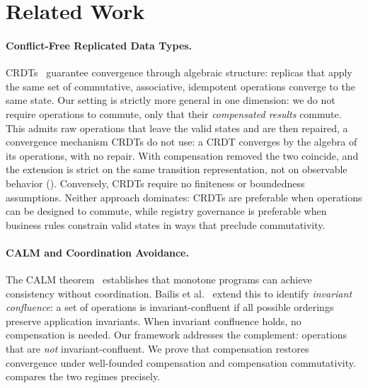\documentclass[11pt,a4paper]{article}
\theoremstyle{plain}
\theoremstyle{definition}
\theoremstyle{remark}
\renewcommand{\_}{\textunderscore\allowbreak}
\begin{document}
\section{Related Work}
\label{sec:related}

\paragraph{Conflict-Free Replicated Data Types.}
CRDTs~\cite{shapiro2011crdt} guarantee convergence through algebraic
structure: replicas that apply the same set of commutative, associative,
idempotent operations converge to the same state.  Our setting is strictly more
general in one dimension: we do not require operations to commute, only that
their \emph{compensated results} commute.  This admits raw operations that
leave the valid states and are then repaired, a convergence mechanism CRDTs do
not use: a CRDT converges by the algebra of its operations, with no repair.
With compensation removed the two coincide, and the extension is strict on the
same transition representation, not on observable behavior
().  Conversely,
CRDTs require no finiteness or boundedness assumptions.  Neither approach
dominates: CRDTs are preferable when operations can be designed to commute,
while registry governance is preferable when business rules constrain valid
states in ways that preclude commutativity.

\paragraph{CALM and Coordination Avoidance.}
The CALM theorem~\cite{hellerstein2010declarative,ameloot2013relational}
establishes that monotone programs can achieve consistency without coordination.
Bailis et al.~\cite{bailis2014coordination} extend this to identify
\emph{invariant confluence}: a set of operations is invariant-confluent if all
possible orderings preserve application invariants.  When invariant confluence
holds, no compensation is needed.  Our framework addresses the complement:
operations that are \emph{not} invariant-confluent.  We prove that
compensation restores convergence under well-founded compensation and
compensation commutativity.   compares the two regimes
precisely.
\end{document}
